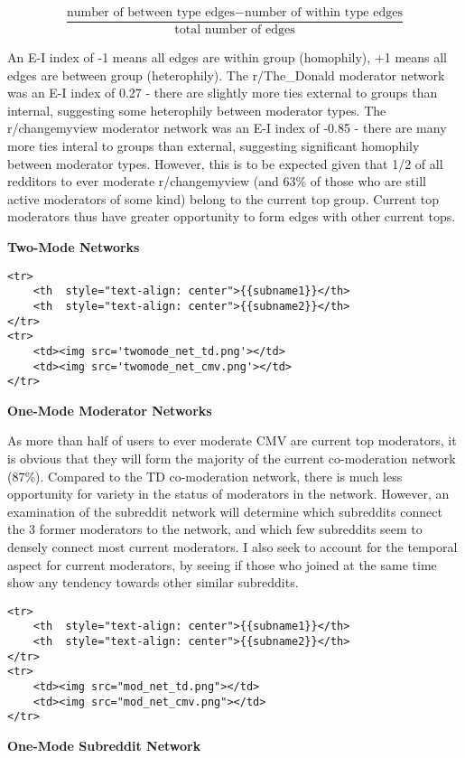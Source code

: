 \documentclass[11pt]{article}
\begin{document}
\[\frac{\textrm{number of between type edges} - \textrm{number of within type edges}}{\textrm{total number of edges}}\]

An E-I index of -1 means all edges are within group (homophily), +1
means all edges are between group (heterophily). The r/The\_Donald
moderator network was an E-I index of 0.27 - there are slightly more
ties external to groups than internal, suggesting some heterophily
between moderator types. The r/changemyview moderator network was an E-I
index of -0.85 - there are many more ties interal to groups than
external, suggesting significant homophily between moderator types.
However, this is to be expected given that 1/2 of all redditors to ever
moderate r/changemyview (and 63\% of those who are still active
moderators of some kind) belong to the current top group. Current top
moderators thus have greater opportunity to form edges with other
current tops.

    \textbf{Two-Mode Networks}

\begin{verbatim}
<tr>
    <th  style="text-align: center">{{subname1}}</th>
    <th  style="text-align: center">{{subname2}}</th>
</tr>
<tr>
    <td><img src='twomode_net_td.png'></td>
    <td><img src='twomode_net_cmv.png'></td>
</tr>
\end{verbatim}

    \textbf{One-Mode Moderator Networks}

As more than half of users to ever moderate CMV are current top
moderators, it is obvious that they will form the majority of the
current co-moderation network (87\%). Compared to the TD co-moderation
network, there is much less opportunity for variety in the status of
moderators in the network. However, an examination of the subreddit
network will determine which subreddits connect the 3 former moderators
to the network, and which few subreddits seem to densely connect most
current moderators. I also seek to account for the temporal aspect for
current moderators, by seeing if those who joined at the same time show
any tendency towards other similar subreddits.

\begin{verbatim}
<tr>
    <th  style="text-align: center">{{subname1}}</th>
    <th  style="text-align: center">{{subname2}}</th>
</tr>
<tr>
    <td><img src="mod_net_td.png"></td>
    <td><img src="mod_net_cmv.png"></td>
</tr>
\end{verbatim}

    \textbf{One-Mode Subreddit Network}
\end{document}
